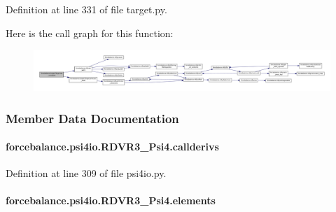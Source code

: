 Definition at line 331 of file target.\-py.



Here is the call graph for this function\-:\nopagebreak
\begin{figure}[H]
\begin{center}
\leavevmode
\includegraphics[width=350pt]{classforcebalance_1_1target_1_1Target_af6099ec09486213869dba2491bd8ea04_cgraph}
\end{center}
\end{figure}




\subsubsection{Member Data Documentation}
\hypertarget{classforcebalance_1_1psi4io_1_1RDVR3__Psi4_aac0fda10840086df3d343c722addbb3c}{
\paragraph[{callderivs}]{\setlength{\rightskip}{0pt plus 5cm}forcebalance.\-psi4io.\-R\-D\-V\-R3\-\_\-\-Psi4.\-callderivs}}\label{classforcebalance_1_1psi4io_1_1RDVR3__Psi4_aac0fda10840086df3d343c722addbb3c}


Definition at line 309 of file psi4io.\-py.

\hypertarget{classforcebalance_1_1psi4io_1_1RDVR3__Psi4_af55d3d535249fb29e26f7fd236f6b08e}{
\paragraph[{elements}]{\setlength{\rightskip}{0pt plus 5cm}forcebalance.\-psi4io.\-R\-D\-V\-R3\-\_\-\-Psi4.\-elements}}\label{classforcebalance_1_1psi4io_1_1RDVR3__Psi4_af55d3d535249fb29e26f7fd236f6b08e}


